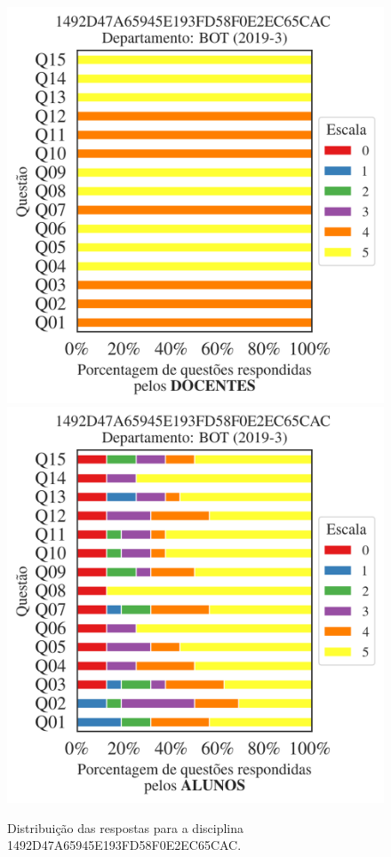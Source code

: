 \documentclass[a4paper,10pt]{article}
\begin{document}
\begin{figure}[h]
\centering
\includegraphics[width=0.485\linewidth]{analise_disciplina_departamento_BOT_1492D47A65945E193FD58F0E2EC65CAC_docentes.png}
\includegraphics[width=0.485\linewidth]{analise_disciplina_departamento_BOT_1492D47A65945E193FD58F0E2EC65CAC_alunos.png}
\caption{\label{fig:analise_geral_departamento}                Distribuição das respostas para a disciplina 1492D47A65945E193FD58F0E2EC65CAC. }
\end{figure}
\end{document}
